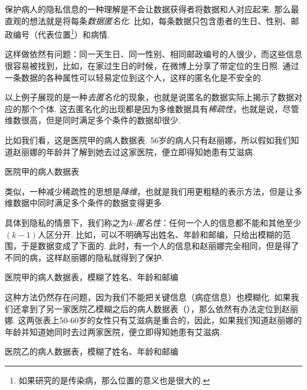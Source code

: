 保护病人的隐私信息的一种理解是不会让数据获得者将数据和人对应起来. 那么最直观的想法就是将每条\textit{数据匿名化}. 比如，每条数据只包含患者的生日、性别、邮政编号（代表位置\footnote{如果研究的是传染病，那么位置的意义也是很大的. }）和病情.

这样做依然有问题：同一天生日、同一性别、相同邮政编号的人很少，而这些信息很容易被找到，比如，在家过生日的时候，在微博上分享了带定位的生日照. 通过一条数据的各种属性可以轻易定位到这个人，这样的匿名化是不安全的.

以上例子展现的是一种\textit{去匿名化}的现象，也就是说匿名的数据实际上揭示了数据对应的那个个体. 这去匿名化的出现都是因为多维数据具有\textit{稀疏性}，也就是说，尽管维数很高，但是同时满足多个条件的数据却很少. 

比如我们看，这是医院甲的病人数据表. 56岁的病人只有赵丽娜，所以假如我们知道赵丽娜的年龄并了解到她去过这家医院，便立即得知她患有艾滋病.

\begin{table}[!ht]
\centering

\caption{医院甲的病人数据表}
\label{tab:tab01}
\end{table}

类似，一种减少稀疏性的思想是\textit{降维}，也就是我们用更粗糙的表示方法，但是让多维数据中同时满足多个条件的数据变得更多. 

具体到隐私的情景下，我们称之为\textit{$k$-匿名性}：任何一个人的信息都不能和其他至少$(k-1)$人区分开. 比如，可以不明确写出姓名、年龄和邮编，只给出模糊的范围，于是数据变成了下面的. 此时，有一个人的信息和赵丽娜完全相同，但是得了不同的病，这样赵丽娜的隐私就得到了保护.

\begin{table}[!ht]
\centering

\caption{医院甲的病人数据表，模糊了姓名、年龄和邮编}
\label{tab:tab02}
\end{table}

这种方法仍然存在问题，因为我们不能把关键信息（病症信息）也模糊化. 如果我们还拿到了另一家医院乙模糊之后的病人数据表（），那么依然有办法定位到赵丽娜. 这两张表上50-60岁的女性只有艾滋病是重合的，因此，如果我们知道赵丽娜的年龄并知道她同时去过两家医院，便立即得知她患有艾滋病.

\begin{table}[!ht]
\centering

\caption{医院乙的病人数据表，模糊了姓名、年龄和邮编}
\label{tab:tab03}
\end{table}

